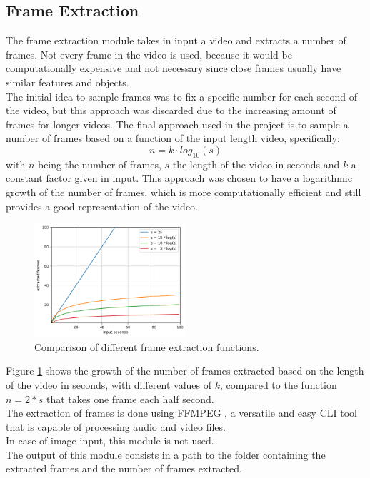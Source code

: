\documentclass[conference]{IEEEtran}
\begin{document}
\subsection{Frame Extraction}
The frame extraction module takes in input a video and extracts a number of frames. 
Not every frame in the video is used, because it would be computationally expensive and not necessary since close frames usually have similar features and objects.\\
The initial idea to sample frames was to fix a specific number for each second of the video, 
but this approach was discarded due to the increasing amount of frames for longer videos. The final approach used in the project is to sample a number of frames based on a function of the input length video, specifically:
$$n = k \cdot log_{10}(s)$$
with $n$ being the number of frames, $s$ the length of the video in seconds and $k$ a constant factor given in input. This approach was chosen to have a logarithmic growth of the number of frames, which is more computationally efficient and still provides a good representation of the video.\\
\begin{figure}[h]
    \centerline{\includegraphics[width=0.5\textwidth]{frame_extr.png}}
    \caption{Comparison of different frame extraction functions.}
    \label{frame_extraction}
\end{figure}

Figure \ref{frame_extraction} shows the growth of the number of frames extracted based on the length 
of the video in seconds, with different values of $k$, compared to the function $n = 2 * s$ that takes one frame each half second. \\
The extraction of frames is done using FFMPEG \cite{ffmpeg}, a versatile and easy CLI tool that is capable of processing audio and video files. \\
In case of image input, this module is not used. \\
The output of this module consists in a path to the folder containing the extracted frames and the number of frames extracted.
\end{document}
